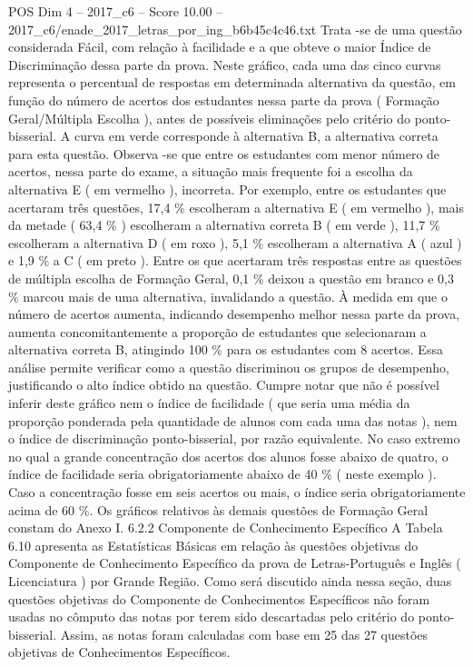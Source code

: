 \begin{textsample}{POS Dim 4 – 2017\_c6 – Score 10.00 – 2017\_c6/enade\_2017\_letras\_por\_ing\_b6b45c4c46.txt}
Trata -se de uma questão considerada Fácil, com relação à facilidade e a que obteve o maior Índice de Discriminação dessa parte da prova.
Neste gráfico, cada uma das cinco curvas representa o percentual de respostas em determinada alternativa da questão, em função do número de acertos dos estudantes nessa parte da prova ( Formação Geral/Múltipla Escolha ), antes de possíveis eliminações pelo critério do ponto-bisserial.
A curva em verde corresponde à alternativa B, a alternativa correta para esta questão.
Observa -se que entre os estudantes com menor número de acertos, nessa parte do exame, a situação mais frequente foi a escolha da alternativa E ( em vermelho ), incorreta.
Por exemplo, entre os estudantes que acertaram três questões, 17,4 \% escolheram a alternativa E ( em vermelho ), mais da metade ( 63,4 \% ) escolheram a alternativa correta B ( em verde ), 11,7 \% escolheram a alternativa D ( em roxo ), 5,1 \% escolheram a alternativa A ( azul ) e 1,9 \% a C ( em preto ).
Entre os que acertaram três respostas entre as questões de múltipla escolha de Formação Geral, 0,1 \% deixou a questão em branco e 0,3 \% marcou mais de uma alternativa, invalidando a questão.
À medida em que o número de acertos aumenta, indicando desempenho melhor nessa parte da prova, aumenta concomitantemente a proporção de estudantes que selecionaram a alternativa correta B, atingindo 100 \% para os estudantes com 8 acertos.
Essa análise permite verificar como a questão discriminou os grupos de desempenho, justificando o alto índice obtido na questão.
Cumpre notar que não é possível inferir deste gráfico nem o índice de facilidade ( que seria uma média da proporção ponderada pela quantidade de alunos com cada uma das notas ), nem o índice de discriminação ponto-bisserial, por razão equivalente.
No caso extremo no qual a grande concentração dos acertos dos alunos fosse abaixo de quatro, o índice de facilidade seria obrigatoriamente abaixo de 40 \% ( neste exemplo ).
Caso a concentração fosse em seis acertos ou mais, o índice seria obrigatoriamente acima de 60 \%.
Os gráficos relativos às demais questões de Formação Geral constam do Anexo I. 6.2.2 Componente de Conhecimento Específico A Tabela 6.10 apresenta as Estatísticas Básicas em relação às questões objetivas do Componente de Conhecimento Específico da prova de Letras-Português e Inglês ( Licenciatura ) por Grande Região.
Como será discutido ainda nessa seção, duas questões objetivas do Componente de Conhecimentos Específicos não foram usadas no cômputo das notas por terem sido descartadas pelo critério do ponto-bisserial.
Assim, as notas foram calculadas com base em 25 das 27 questões objetivas de Conhecimentos Específicos.

\end{textsample}
